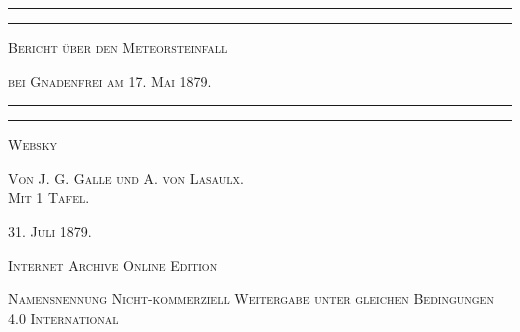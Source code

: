\documentclass[a4paper, 11pt, oneside]{article}
\begin{document}
\begin{titlepage} %
	\centering %

	
	\rule{\textwidth}{1.6pt}\vspace*{-\baselineskip}\vspace*{2pt} %
	\rule{\textwidth}{0.4pt} %
	
	\vspace{1.5\baselineskip} %
	
	{\scshape\LARGE Bericht über den Meteorsteinfall}
	
	\vspace{1\baselineskip} %

	{\scshape\LARGE bei Gnadenfrei am 17. Mai 1879.}

	\vspace{1.5\baselineskip} %

	\rule{\textwidth}{0.4pt}\vspace*{-\baselineskip}\vspace{3.2pt} %
	\rule{\textwidth}{1.6pt} %
	
	\vspace{1\baselineskip} %
	
	
	{\scshape Websky} %
	
	\vspace*{1\baselineskip} %
	
    {\scshape\small Von J. G. Galle und A. von Lasaulx.\\ Mit 1 Tafel.} %
    
    \vspace*{\fill}

	\vspace{1\baselineskip}

	{\small\scshape 31. Juli 1879.}
	
	\vspace{0.5\baselineskip} %

    \scshape Internet Archive Online Edition  %
	
	{\scshape\small Namensnennung Nicht-kommerziell Weitergabe unter gleichen Bedingungen 4.0 International} %
\end{titlepage}
\setlength{\parskip}{1mm plus1mm minus1mm}
\clearpage
\tableofcontents
\clearpage
\end{document}
